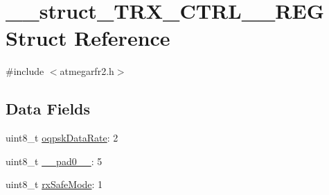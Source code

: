 \hypertarget{struct____struct___t_r_x___c_t_r_l__2___r_e_g}{\section{\-\_\-\-\_\-struct\-\_\-\-T\-R\-X\-\_\-\-C\-T\-R\-L\-\_\-\_\-\-R\-E\-G Struct Reference}
\label{struct____struct___t_r_x___c_t_r_l__2___r_e_g}
}


{\ttfamily \#include $<$atmegarfr2.\-h$>$}

\subsection*{Data Fields}
\begin{DoxyCompactItemize}
\item 
uint8\-\_\-t \hyperlink{struct____struct___t_r_x___c_t_r_l__2___r_e_g_abf0824b4167a190b7af2c5db16b7f6fb}{oqpsk\-Data\-Rate}\-: 2
\item 
uint8\-\_\-t \hyperlink{struct____struct___t_r_x___c_t_r_l__2___r_e_g_ae5fbcd2071e024d4de8b0cae5bab290e}{\-\_\-\-\_\-pad0\-\_\-\-\_\-}\-: 5
\item 
uint8\-\_\-t \hyperlink{struct____struct___t_r_x___c_t_r_l__2___r_e_g_a632f6bc12e3fde2408cb9f6f87549181}{rx\-Safe\-Mode}\-: 1
\end{DoxyCompactItemize}



